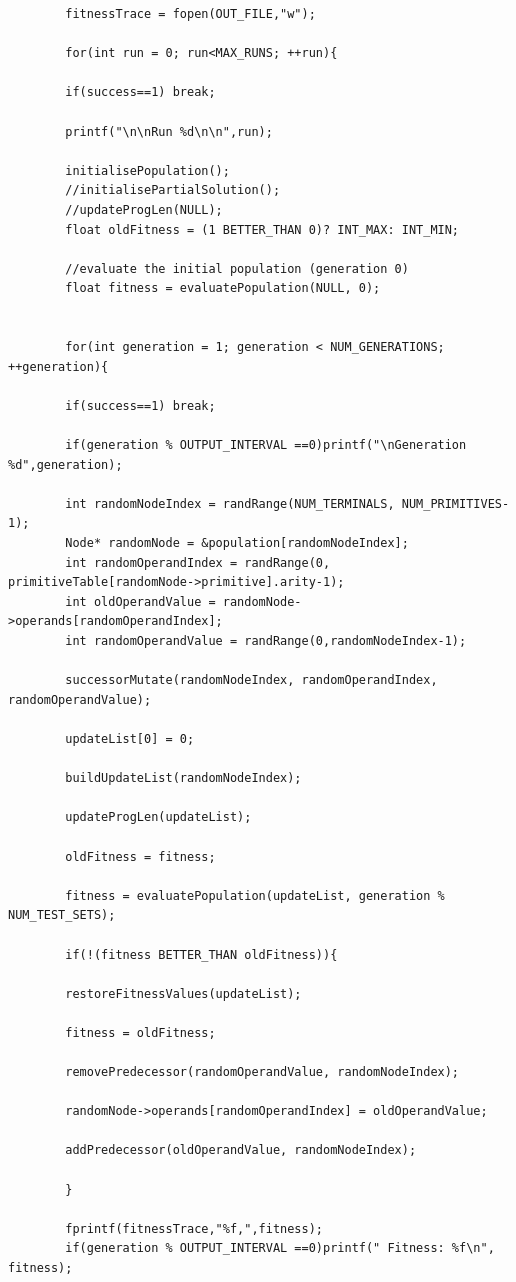\documentclass{article}
\begin{document}
\begin{lstlisting}
	    fitnessTrace = fopen(OUT_FILE,"w");
	    
	    for(int run = 0; run<MAX_RUNS; ++run){
	    
	    if(success==1) break;
	    
	    printf("\n\nRun %d\n\n",run);
	    
	    initialisePopulation();
	    //initialisePartialSolution();
	    //updateProgLen(NULL);
	    float oldFitness = (1 BETTER_THAN 0)? INT_MAX: INT_MIN;
	    
	    //evaluate the initial population (generation 0)
	    float fitness = evaluatePopulation(NULL, 0);
	    
	    
	    for(int generation = 1; generation < NUM_GENERATIONS; ++generation){
	    
	    if(success==1) break;
	    
	    if(generation % OUTPUT_INTERVAL ==0)printf("\nGeneration %d",generation);
	    
	    int randomNodeIndex = randRange(NUM_TERMINALS, NUM_PRIMITIVES-1);
	    Node* randomNode = &population[randomNodeIndex];
	    int randomOperandIndex = randRange(0, primitiveTable[randomNode->primitive].arity-1);
	    int oldOperandValue = randomNode->operands[randomOperandIndex];
	    int randomOperandValue = randRange(0,randomNodeIndex-1);
	    
	    successorMutate(randomNodeIndex, randomOperandIndex, randomOperandValue);
	    
	    updateList[0] = 0;
	    
	    buildUpdateList(randomNodeIndex);
	    
	    updateProgLen(updateList);
	    
	    oldFitness = fitness;
	    
	    fitness = evaluatePopulation(updateList, generation % NUM_TEST_SETS);
	    
	    if(!(fitness BETTER_THAN oldFitness)){
	    
	    restoreFitnessValues(updateList);
	    
	    fitness = oldFitness;
	    
	    removePredecessor(randomOperandValue, randomNodeIndex);
	    
	    randomNode->operands[randomOperandIndex] = oldOperandValue;
	    
	    addPredecessor(oldOperandValue, randomNodeIndex);
	    
	    }      
	    
	    fprintf(fitnessTrace,"%f,",fitness);
	    if(generation % OUTPUT_INTERVAL ==0)printf(" Fitness: %f\n", fitness);
	    

\end{lstlisting}
\end{document}
